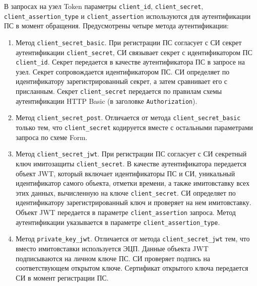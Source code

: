 В запросах на узел Token параметры \lstinline{client_id}, 
\lstinline{client_secret}, \lstinline{client_assertion_type} и 
\lstinline{client_assertion} используются для аутентификации ПС в момент 
обращения.
%
Предусмотрены четыре метода аутентификации:

\begin{enumerate}
\item
Метод \lstinline{client_secret_basic}.
%
При регистрации ПС согласует с СИ секрет аутентификации 
\lstinline{client_secret}, СИ связывает секрет с идентификатором ПС 
\lstinline{client_id}.
%
Секрет передается в качестве аутентификатора ПС в запросе на узел.
Секрет сопровождается идентификатором ПС.
%
СИ определяет по идентификатору зарегистрированный секрет, а затем сравнивает  
его с присланным. 
%
Секрет \lstinline{client_secret} передается по правилам схемы аутентификации 
HTTP Basic (в заголовке \lstinline{Authorization}).

\item
Метод \lstinline{client_secret_post}.
%
Отличается от метода \lstinline{client_secret_basic} только тем, что 
\lstinline{client_secret} кодируется вместе с остальными параметрами 
запроса по схеме Form.

\item
Метод \lstinline{client_secret_jwt}.
%
При регистрации ПС согласует с СИ секретный ключ имитозащиты
\lstinline{client_secret}.
%
В качестве аутентификатора передается объект JWT, который включает 
идентификаторы ПС и СИ, уникальный идентификатор самого объекта, отметки 
времени, а также имитовставку всех этих данных, вычисленную на ключе 
\lstinline{client_secret}.
%
СИ определяет по идентификатору зарегистрированный ключ и проверяет на нем 
имитовставку.  
%
Объект JWT передается в параметре \lstinline{client_assertion} запроса.
%
Метод аутентификации указывается в параметре \lstinline{client_assertion_type}.

\item
Метод \lstinline{private_key_jwt}.
%
Отличается от метода \lstinline{client_secret_jwt} тем, что вместо имитовставки 
используется ЭЦП. 
%
Данные объекта JWT подписываются на личном ключе ПС. СИ проверяет подпись 
на соответствующем открытом ключе. Сертификат открытого ключа передается СИ в 
момент регистрации ПС.
\end{enumerate}

